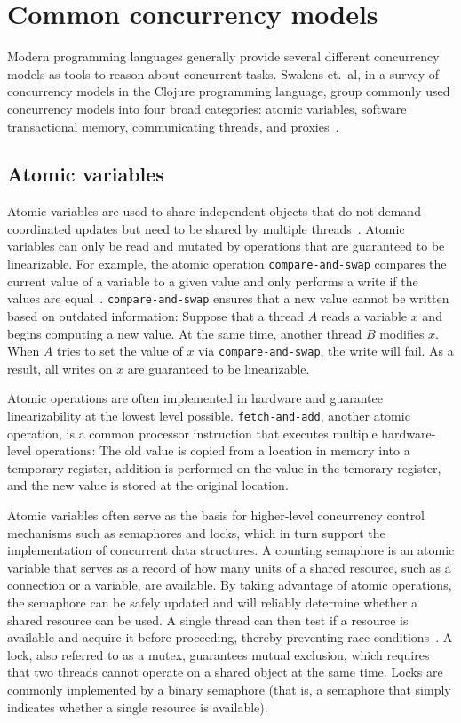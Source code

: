 \documentclass{sig-alternate}
\newcommand{\code}[1]{\texttt{#1}}
\begin{document}
\section{Common concurrency models}

Modern programming languages generally provide several different concurrency models as tools to reason about concurrent tasks. Swalens et.\ al, in a survey of concurrency models in the Clojure programming language, group commonly used concurrency models into four broad categories: atomic variables, software transactional memory, communicating threads, and proxies~\cite{Swalens2014}.

\subsection{Atomic variables}

Atomic variables are used to share independent objects that do not demand coordinated updates but need to be shared by multiple threads~\cite{Swalens2014}. Atomic variables can only be read and mutated by operations that are guaranteed to be linearizable. For example, the atomic operation \code{compare-and-swap} compares the current value of a variable to a given value and only performs a write if the values are equal~\cite{Swalens2014}. \code{compare-and-swap} ensures that a new value cannot be written based on outdated information: Suppose that a thread $A$ reads a variable $x$ and begins computing a new value. At the same time, another thread $B$ modifies $x$. When $A$ tries to set the value of $x$ via \code{compare-and-swap}, the write will fail. As a result, all writes on $x$ are guaranteed to be linearizable.

Atomic operations are often implemented in hardware and guarantee linearizability at the lowest level possible. \code{fetch-and-add}, another atomic operation, is a common processor instruction that executes multiple hardware-level operations: The old value is copied from a location in memory into a temporary register, addition is performed on the value in the temorary register, and the new value is stored at the original location.

Atomic variables often serve as the basis for higher-level concurrency control mechanisms such as semaphores and locks, which in turn support the implementation of concurrent data structures. A counting semaphore is an atomic variable that serves as a record of how many units of a shared resource, such as a connection or a variable, are available. By taking advantage of atomic operations, the semaphore can be safely updated and will reliably determine whether a shared resource can be used. A single thread can then test if a resource is available and acquire it before proceeding, thereby preventing race conditions~\cite{Swalens2014}. A lock, also referred to as a mutex, guarantees mutual exclusion, which requires that two threads cannot operate on a shared object at the same time. Locks are commonly implemented by a binary semaphore (that is, a semaphore that simply indicates whether a single resource is available).
\end{document}

